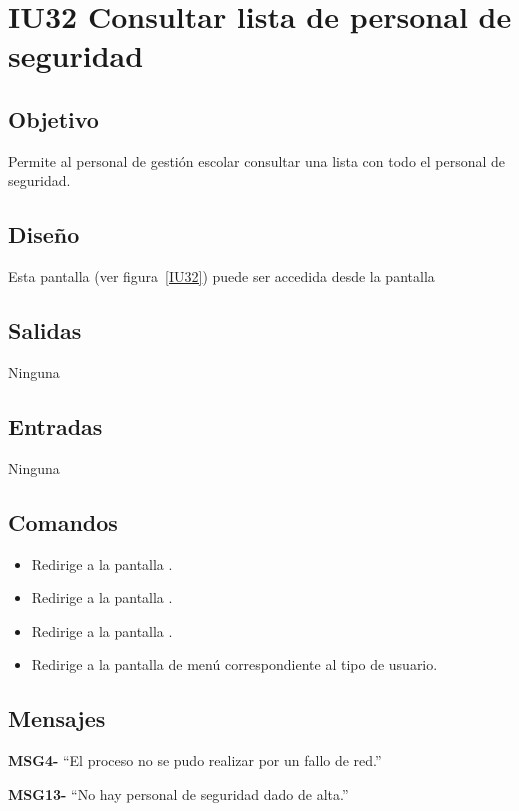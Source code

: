 
\section{IU32 Consultar lista de personal de seguridad}
\subsection{Objetivo}
   Permite al personal de gestión escolar consultar una lista con todo el personal de seguridad.
\subsection{Diseño}
    Esta pantalla  (ver figura~\ref{IU32}) puede ser accedida desde la pantalla 

\subsection{Salidas}
Ninguna
\subsection{Entradas}
Ninguna
\subsection{Comandos}
\begin{itemize}
    \item {} Redirige a la pantalla .
    \item {} Redirige a la pantalla .
    \item {} Redirige a la pantalla .
    \item {} Redirige a la pantalla de menú correspondiente al tipo de usuario.
    
\end{itemize}

\subsection{Mensajes}

\begin{Citemize}
    \item {\bf MSG4-}  ``El proceso no se pudo realizar por un fallo de red.''
    \item {\bf MSG13-}  ``No hay personal de seguridad dado de alta.''
    
\end{Citemize}


